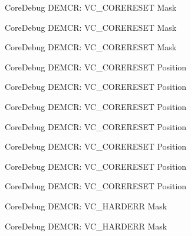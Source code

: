 \begin{DoxyRefList}
\label{deprecated__deprecated000356}%
%
Core\+Debug D\+E\+M\+CR\+: V\+C\+\_\+\+C\+O\+R\+E\+R\+E\+S\+ET Mask 

\label{deprecated__deprecated000432}%
%
Core\+Debug D\+E\+M\+CR\+: V\+C\+\_\+\+C\+O\+R\+E\+R\+E\+S\+ET Mask 

\label{deprecated__deprecated000521}%
%
Core\+Debug D\+E\+M\+CR\+: V\+C\+\_\+\+C\+O\+R\+E\+R\+E\+S\+ET Mask  
\item[Member \mbox{\hyperlink{group__CMSIS__CoreDebug_ga9fcf09666f7063a7303117aa32a85d5a}{Core\+Debug\+\_\+\+D\+E\+M\+C\+R\+\_\+\+V\+C\+\_\+\+C\+O\+R\+E\+R\+E\+S\+E\+T\+\_\+\+Pos}} ]\label{deprecated__deprecated000069}%
%
Core\+Debug D\+E\+M\+CR\+: V\+C\+\_\+\+C\+O\+R\+E\+R\+E\+S\+ET Position 

\label{deprecated__deprecated000137}%
%
Core\+Debug D\+E\+M\+CR\+: V\+C\+\_\+\+C\+O\+R\+E\+R\+E\+S\+ET Position 

\label{deprecated__deprecated000213}%
%
Core\+Debug D\+E\+M\+CR\+: V\+C\+\_\+\+C\+O\+R\+E\+R\+E\+S\+ET Position 

\label{deprecated__deprecated000276}%
%
Core\+Debug D\+E\+M\+CR\+: V\+C\+\_\+\+C\+O\+R\+E\+R\+E\+S\+ET Position 

\label{deprecated__deprecated000355}%
%
Core\+Debug D\+E\+M\+CR\+: V\+C\+\_\+\+C\+O\+R\+E\+R\+E\+S\+ET Position 

\label{deprecated__deprecated000431}%
%
Core\+Debug D\+E\+M\+CR\+: V\+C\+\_\+\+C\+O\+R\+E\+R\+E\+S\+ET Position 

\label{deprecated__deprecated000520}%
%
Core\+Debug D\+E\+M\+CR\+: V\+C\+\_\+\+C\+O\+R\+E\+R\+E\+S\+ET Position  
\item[Member \mbox{\hyperlink{group__CMSIS__CoreDebug_ga803fc98c5bb85f10f0347b23794847d1}{Core\+Debug\+\_\+\+D\+E\+M\+C\+R\+\_\+\+V\+C\+\_\+\+H\+A\+R\+D\+E\+R\+R\+\_\+\+Msk}} ]\label{deprecated__deprecated000056}%
%
Core\+Debug D\+E\+M\+CR\+: V\+C\+\_\+\+H\+A\+R\+D\+E\+RR Mask 

\label{deprecated__deprecated000136}%
%
Core\+Debug D\+E\+M\+CR\+: V\+C\+\_\+\+H\+A\+R\+D\+E\+RR Mask 


\end{DoxyRefList}
